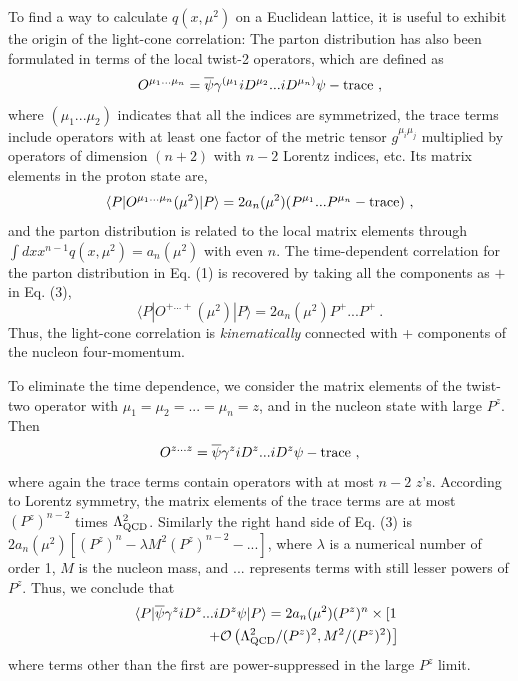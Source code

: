 To find a way to calculate $q(x,\mu^2)$ on a Euclidean lattice, it is useful to
exhibit the origin of the light-cone correlation: The parton distribution has also been formulated in terms of
the local twist-2 operators, which are defined as
\begin{equation}
     O^{\mu_1...\mu_n}= {\overline \psi}\gamma^{(\mu_1}iD^{\mu_2} ... iD^{\mu_n)} \psi
                 - {\rm trace} \ ,
\end{equation}
where $(\mu_1...\mu_2)$ indicates that all the indices are symmetrized, the trace terms include
operators with at least one factor of the metric tensor $g^{\mu_i \mu_j}$ multiplied by
operators of dimension $(n+2)$ with $n-2$ Lorentz indices, etc. Its matrix elements in the proton state
are,
\begin{equation}
    \langle P|O^{\mu_1...\mu_n}(\mu^2)|P\rangle =
    2a_n(\mu^2) (P^{\mu_1} ... P^{\mu_n} - {\rm trace}) \ ,
\end{equation}
and the parton distribution is related to the local matrix elements through $\int dx x^{n-1} q(x, \mu^2)
= a_n(\mu^2)$ with even $n$. The time-dependent correlation for the parton distribution
in Eq. (1) is recovered by taking all the
components as $+$ in Eq. (3),
\begin{equation}
   \langle P|O^{+...+}(\mu^2)|P\rangle =2 a_n(\mu^2) P^+...P^+ \ .
\end{equation}
Thus, the light-cone correlation is {\it kinematically} connected with
+ components of the nucleon four-momentum.

To eliminate the time dependence, we consider the matrix elements of the twist-two operator with $\mu_1=\mu_2=...=\mu_n=z$,
and in the nucleon state with large $P^z$.  Then
\begin{equation}
   O^{z...z} = {\overline \psi}\gamma^{z}iD^{z} ... iD^{z} \psi - {\rm trace} \ ,
\end{equation}
where again the trace terms contain operators with at most $n-2$ $z$'s. According
to Lorentz symmetry, the matrix elements of the trace terms are at most
$(P^z)^{n-2}$ times $\Lambda^2_{\rm QCD}$. Similarly the right hand side of Eq. (3) is
$2a_n(\mu^2)\left[(P^z)^n-\lambda M^2(P^z)^{n-2}-...\right]$, where $\lambda$ is a numerical number of
order 1, $M$ is the nucleon mass, and ... represents terms
with still lesser powers of $P^z$. Thus, we conclude that
\begin{eqnarray}
     && \langle P| {\overline \psi}\gamma^{z}iD^{z} ... iD^{z} \psi|P\rangle
       = 2a_n(\mu^2) (P^z)^n\times \left[ 1 \right.\\ && \left.+ {\cal O}\left(\Lambda^2_{\rm QCD}/(P^z)^2,  M^2/(P^z)^2\right)\right] \nonumber
\end{eqnarray}
where terms other than the first are power-suppressed in the large $P^z$ limit.

